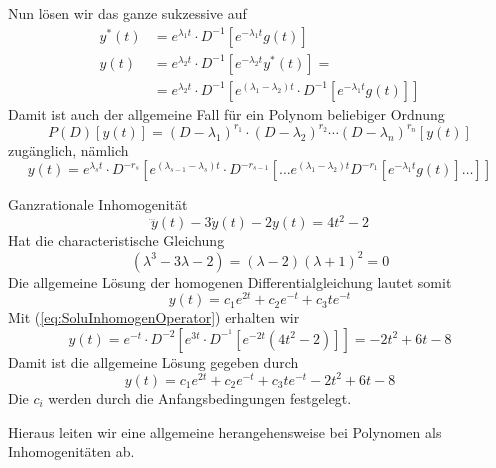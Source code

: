 Nun lösen wir das ganze sukzessive auf
\begin{align} 
  y^*(t)&=e^{\lambda_1t}\cdot D^{-1}\left[e^{-\lambda_1 t}g(t)\right]\nonumber\\
  y(t)  &=e^{\lambda_2t}\cdot D^{-1}\left[e^{-\lambda_2 t}y^*(t)\right]=\nonumber\\
        &=e^{\lambda_2t}\cdot D^{-1}\left[e^{(\lambda_1-\lambda_2) t}\cdot
      D^{-1}\left[e^{-\lambda_1 t}g(t)\right]\right]
  \label{eq:DGL2OrdnungSolu}
\end{align}
Damit ist auch der allgemeine Fall für ein Polynom beliebiger Ordnung 
\[ P(D)[y(t)]=(D-\lambda_1)^{r_1}\cdot(D-\lambda_2)^{r_2}\cdots 
(D-\lambda_n)^{r_n}[y(t)]\]
zugänglich, nämlich
\begin{equation}
  y(t)=e^{\lambda_s t}\cdot D^{-r_s}[e^{(\lambda_{s-1}-\lambda_s)t}\cdot D^{-r_{s-1}}
  [\dots e^{(\lambda_1-\lambda_2)t}D^{-r_1}[e^{-\lambda_1t}g(t)]\dots]]
  \label{eq:SoluInhomogenOperator}
\end{equation}
\begin{example}{Ganzrationale Inhomogenität}
  \[\dddot{y}(t)-3\dot{y}(t)-2y(t)=4t^2-2\]
  Hat die characteristische Gleichung
  \[(\lambda^3-3\lambda-2)=(\lambda-2)(\lambda+1)^2=0\]
  Die allgemeine Lösung der homogenen Differentialgleichung lautet somit
  \[y(t)=c_1e^{2t}+c_2e^{-t}+c_3te^{-t}\]
  Mit (\ref{eq:SoluInhomogenOperator}) erhalten wir
  \[
    y(t)=e^{-t}\cdot D^{-2}[e^{3t}\cdot D^{-^1}[e^{-2t}(4t^2-2)]]=-2t^2+6t-8
  \]
  Damit ist die allgemeine Lösung gegeben durch
  \[ y(t)=c_1e^{2t}+c_2e^{-t}+c_3te^{-t}-2t^2+6t-8 \]
  Die $c_i$ werden durch die Anfangsbedingungen festgelegt.
\end{example}
Hieraus leiten wir eine allgemeine herangehensweise bei Polynomen als
Inhomogenitäten ab.
